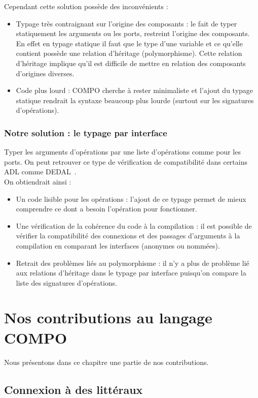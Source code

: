 \documentclass[11pt,a4paper,openany,oneside]{book}
\begin{document}
Cependant cette solution possède des inconvénients : 
\begin{itemize}
\item Typage très contraignant sur l'origine des composants : le fait de typer statiquement les arguments ou les ports, restreint l'origine des composants. En effet en typage statique il faut que le type d'une variable et ce qu'elle contient possède une relation d'héritage (polymorphisme). Cette relation d'héritage implique qu'il est difficile de mettre en relation des composants d'origines diverses.
\item Code plus lourd : COMPO cherche à rester minimaliste et l'ajout du typage statique rendrait la syntaxe beaucoup plus lourde (surtout sur les signatures d'opérations).
\end{itemize}

\clearpage

\subsection{Notre solution : le typage par interface}
Typer les arguments d'opérations par une liste d'opérations comme pour les ports. On peut retrouver ce type de vérification de compatibilité dans certains ADL comme DEDAL~\citep{dedal}.\\
On obtiendrait ainsi : 
\begin{itemize}
\item Un code lisible pour les opérations : l'ajout de ce typage permet de mieux comprendre ce dont a besoin l'opération pour fonctionner.
\item Une vérification de la cohérence du code à la compilation : il est possible de vérifier la compatibilité des connexions et des passages d'arguments à la compilation en comparant les interfaces (anonymes ou nommées).
\item Retrait des problèmes liés au polymorphisme : il n'y a plus de problème lié aux relations d'héritage dans le typage par interface puisqu'on compare la liste des signatures d'opérations.
\end{itemize}

\chapter{Nos contributions au langage COMPO}

Nous présentons dans ce chapitre une partie de nos contributions.

\section{Connexion à des littéraux}
\end{document}
